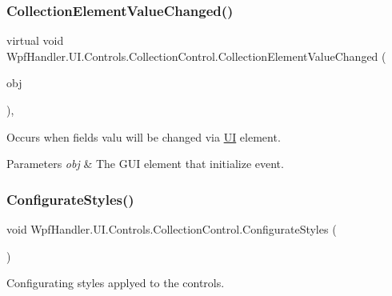 \subsubsection{\texorpdfstring{Collection\+Element\+Value\+Changed()}{CollectionElementValueChanged()}}
{\footnotesize\ttfamily virtual void Wpf\+Handler.\+U\+I.\+Controls.\+Collection\+Control.\+Collection\+Element\+Value\+Changed (\begin{DoxyParamCaption}\item[{\mbox{\hyperlink{interface_wpf_handler_1_1_u_i_1_1_auto_layout_1_1_i_g_u_i_field}{I\+G\+U\+I\+Field}}}]{obj }\end{DoxyParamCaption})\hspace{0.3cm}{\ttfamily [protected]}, {\ttfamily [virtual]}}



Occurs when field\textquotesingle{}s valu will be changed via \mbox{\hyperlink{namespace_wpf_handler_1_1_u_i}{UI}} element. 


\begin{DoxyParams}{Parameters}
{\em obj} & The G\+UI element that initialize event.\\
\hline
\end{DoxyParams}
\mbox{\label{class_wpf_handler_1_1_u_i_1_1_controls_1_1_collection_control_a5fdb64f8a451f387f2a36686f0fec014}} 
\subsubsection{\texorpdfstring{Configurate\+Styles()}{ConfigurateStyles()}}
{\footnotesize\ttfamily void Wpf\+Handler.\+U\+I.\+Controls.\+Collection\+Control.\+Configurate\+Styles (\begin{DoxyParamCaption}{ }\end{DoxyParamCaption})\hspace{0.3cm}{\ttfamily [protected]}}



Configurating styles applyed to the controls. 

\mbox{\label{class_wpf_handler_1_1_u_i_1_1_controls_1_1_collection_control_ae703be50b290be72a7a40acbfe65b04c}} 
